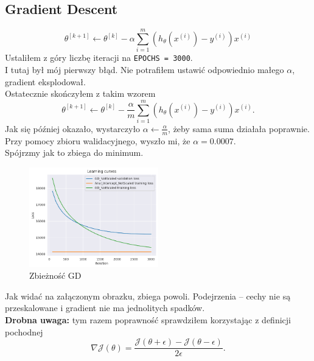 \documentclass[a4paper,12pt]{article}
\begin{document}
\subsection{Gradient Descent}
\[\theta^{[k+1]} \leftarrow \theta^{[k]} - \alpha \sum_{i=1}^{m}{(h_{\theta}(x^{(i)}) - y^{(i)})x^{(i)}}\]
Ustaliłem z góry liczbę iteracji na \texttt{EPOCHS = 3000}. \\
I tutaj był mój pierwszy błąd. Nie potrafiłem ustawić odpowiednio małego $\alpha$, gradient eksplodował. \\
Ostatecznie skończyłem z takim wzorem
\[\theta^{[k+1]} \leftarrow \theta^{[k]} - \frac{\alpha}{m}\sum_{i=1}^{m}{(h_{\theta}(x^{(i)}) - y^{(i)})x^{(i)}}.\]
Jak się później okazało, wystarczyło $\alpha \leftarrow \frac{\alpha}{m}$, żeby sama suma działała poprawnie. \\
Przy pomocy zbioru walidacyjnego, wyszło mi, że $\alpha = 0.0007$. \\
Spójrzmy jak to zbiega do minimum.
\begin{figure}[h!]
    \centering
    \includegraphics[width=0.5\textwidth]{gd_notscaled.png}
    \caption{Zbieżność GD}
\end{figure}
Jak widać na załączonym obrazku, zbiega powoli. Podejrzenia -- cechy nie są przeskalowane i gradient nie ma jednolitych spadków. \\
\textbf{Drobna uwaga:} tym razem poprawność sprawdziłem korzystając z definicji pochodnej
\[\nabla \mathcal{J}(\theta) =  \frac{\mathcal{J}(\theta + \epsilon) - \mathcal{J}(\theta - \epsilon)}{2\epsilon}.\]
\end{document}
